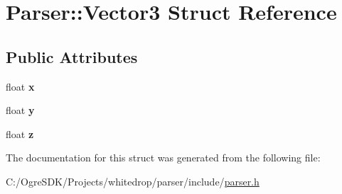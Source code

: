 \hypertarget{struct_parser_1_1_vector3}{\section{Parser\+:\+:Vector3 Struct Reference}
\label{struct_parser_1_1_vector3}
}
\subsection*{Public Attributes}
\begin{DoxyCompactItemize}
\item 
\hypertarget{struct_parser_1_1_vector3_a0e93f9ebef65c4f83a595e64f0abf1e8}{float {\bfseries x}}\label{struct_parser_1_1_vector3_a0e93f9ebef65c4f83a595e64f0abf1e8}

\item 
\hypertarget{struct_parser_1_1_vector3_a753eb98c537d32f2eedf2fcd13448fd0}{float {\bfseries y}}\label{struct_parser_1_1_vector3_a753eb98c537d32f2eedf2fcd13448fd0}

\item 
\hypertarget{struct_parser_1_1_vector3_ac544de3c6e386985ea413c5709542fa5}{float {\bfseries z}}\label{struct_parser_1_1_vector3_ac544de3c6e386985ea413c5709542fa5}

\end{DoxyCompactItemize}


The documentation for this struct was generated from the following file\+:\begin{DoxyCompactItemize}
\item 
C\+:/\+Ogre\+S\+D\+K/\+Projects/whitedrop/parser/include/\hyperlink{parser_8h}{parser.\+h}\end{DoxyCompactItemize}
